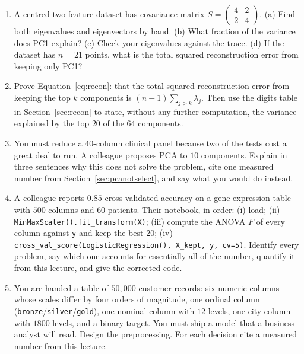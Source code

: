 \documentclass[11pt]{article}
\begin{document}
\begin{enumerate}[leftmargin=*]
  \item\label{q:pca} A centred two-feature dataset has covariance matrix
    $S = \begin{pmatrix} 4 & 2\\ 2 & 4\end{pmatrix}$. (a) Find both
    eigenvalues and eigenvectors by hand. (b) What fraction of the variance
    does PC1 explain? (c) Check your eigenvalues against the trace. (d) If the
    dataset has $n = 21$ points, what is the total squared reconstruction
    error from keeping only PC1?

  \item\label{q:recon} Prove Equation~\eqref{eq:recon}: that the total squared
    reconstruction error from keeping the top $k$ components is
    $(n-1)\sum_{j>k}\lambda_j$. Then use the digits table in
    Section~\ref{sec:recon} to state, without any further computation, the
    variance explained by the top $20$ of the $64$ components.

  \item\label{q:vspca} You must reduce a $40$-column clinical panel because
    two of the tests cost a great deal to run. A colleague proposes PCA to
    $10$ components. Explain in three sentences why this does not solve the
    problem, cite one measured number from Section~\ref{sec:pcanotselect}, and
    say what you would do instead.

  \item\label{q:debug} A colleague reports $0.85$ cross-validated accuracy on
    a gene-expression table with $500$ columns and $60$ patients. Their
    notebook, in order: (i) load; (ii)
    \texttt{MinMaxScaler().fit\_transform(X)}; (iii) compute the ANOVA $F$ of
    every column against \texttt{y} and keep the best $20$; (iv)
    \texttt{cross\_val\_score(LogisticRegression(), X\_kept, y, cv=5)}.
    Identify every problem, say which one accounts for essentially all of the
    number, quantify it from this lecture, and give the corrected code.

  \item\label{q:design} You are handed a table of $50{,}000$ customer records:
    six numeric columns whose scales differ by four orders of magnitude, one
    ordinal column (\texttt{bronze}/\texttt{silver}/\texttt{gold}), one
    nominal column with $12$ levels, one city column with $1800$ levels, and a
    binary target. You must ship a model that a business analyst will read.
    Design the preprocessing. For each decision cite a measured number from
    this lecture.
\end{enumerate}
\end{document}
